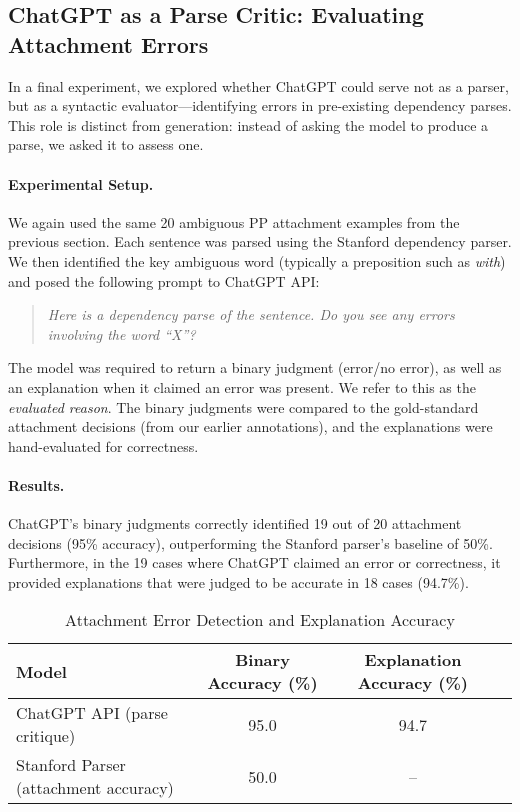 \subsection{ChatGPT as a Parse Critic: Evaluating Attachment Errors}
\label{subsec:chatgpt-critic}

In a final experiment, we explored whether ChatGPT could serve not as a parser, but as a syntactic evaluator—identifying errors in pre-existing dependency parses. This role is distinct from generation: instead of asking the model to produce a parse, we asked it to assess one.

\paragraph{Experimental Setup.}
We again used the same 20 ambiguous PP attachment examples from the previous section. Each sentence was parsed using the Stanford dependency parser. We then identified the key ambiguous word (typically a preposition such as \textit{with}) and posed the following prompt to ChatGPT API:

\begin{quote}
    \textit{Here is a dependency parse of the sentence. Do you see any errors involving the word “X”?}
\end{quote}

The model was required to return a binary judgment (error/no error), as well as an explanation when it claimed an error was present. We refer to this as the \textit{evaluated reason}. The binary judgments were compared to the gold-standard attachment decisions (from our earlier annotations), and the explanations were hand-evaluated for correctness.

\paragraph{Results.}
ChatGPT's binary judgments correctly identified 19 out of 20 attachment decisions (95\% accuracy), outperforming the Stanford parser's baseline of 50\%. Furthermore, in the 19 cases where ChatGPT claimed an error or correctness, it provided explanations that were judged to be accurate in 18 cases (94.7\%).

\begin{table}[h]
\centering
\caption{Attachment Error Detection and Explanation Accuracy}
\label{tab:attachment-critique}
\begin{tabular}{lccc}
\toprule
\textbf{Model} & \textbf{Binary Accuracy (\%)} & \textbf{Explanation Accuracy (\%)} \\
\midrule
ChatGPT API (parse critique) & 95.0 & 94.7 \\
Stanford Parser (attachment accuracy) & 50.0 & -- \\
\bottomrule
\end{tabular}
\end{table}

